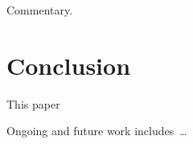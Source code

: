 \documentclass[runningheads]{llncs}
\begin{document}
Commentary.

\section{Conclusion}
\label{Conclusion}

This paper 

Ongoing and future work includes~\ldots



\end{document}
